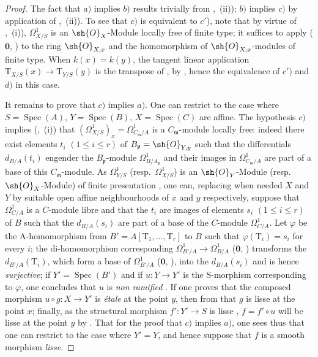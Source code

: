 \begin{proof}
The fact that $a)$ implies $b)$ results trivially from ,~(ii)); $b)$ implies $c)$ by application of ,~(ii)).
To see that $c)$ is equivalent to $c'$), note that by virtue of ,~(i)), $\Omega^1_{X/S}$ is an $\sh{O}_X$-Module locally free of finite type; it suffices to apply ($\mathbf{0}$, ) to the ring $\sh{O}_{X,x}$ and the homomorphism  of $\sh{O}_{X,x}$-modules of finite type.
When $k(x)=k(y)$, the tangent linear application $\mathrm{T}_{X/S}(x)\to\mathrm{T}_{Y/S}(y)$ is the transpose of , by , hence the equivalence of $c')$ and $d)$ in this case.


It remains to prove that $c)$ implies $a)$.
One can restrict to the case where $S=\operatorname{Spec}(A)$, $Y=\operatorname{Spec}(B)$, $X=\operatorname{Spec}(C)$ are affine.
The hypothesis $c)$ implies (,~(i)) that $(\Omega^1_{X/S})_x=\Omega^1_{C_\mathfrak{m}/A}$ is a $C_\mathfrak{m}$-module locally free: indeed  there exist elements $t_i$ $(1\leq i\leq r)$ of $B_\mathfrak{p}=\sh{O}_{Y,y}$ such that the differentials $d_{B/A}(t_i)$ engender the $B_\mathfrak{p}$-module $\Omega^1_{B/A_\mathfrak{p}}$ and their images in $\Omega^1_{C_\mathfrak{m}/A}$ are part of a base of this $C_\mathfrak{m}$-module.
As $\Omega^1_{Y/S}$ (resp.\ $\Omega^1_{X/S}$) is an $\sh{O}_Y$-Module (resp.\ $\sh{O}_X$-Module) of finite presentation , one can, replacing when needed $X$ and $Y$ by suitable open affine neighbourhoods of $x$ and $y$ respectively, suppose that $\Omega^1_{C/A}$ is a $C$-module libre and that the $t_i$ are images of elements $s_i$ $(1\leq i\leq r)$ of $B$ such that the $d_{B/A}(s_i)$ are part of a base of the $C$-module $\Omega^1_{C/A}$.
Let $\varphi$ be the A-homomorphism from $B'=A[\mathrm{T}_1,\ldots,\mathrm{T}_r]$ to $B$ such that $\varphi(\mathrm{T}_i)=s_i$ for every $i$; the di-homomorphism corresponding $\Omega^1_{B'/A}\to\Omega^1_{B/A}$ ($\mathbf{0}$, ) transforms the $d_{B'/A}(\mathrm{T}_i)$, which form a base of $\Omega^1_{B'/A}$ ($\mathbf{0}$, ), into the $d_{B/A}(s_i)$ and is hence \emph{surjective}; if $Y'=\operatorname{Spec}(B')$ and if $u:Y\to Y'$ is the S-morphism corresponding to $\varphi$, one concludes that $u$ is \emph{non ramified} .
If one proves that the composed morphism $u\circ g:X\to Y'$ is \emph{\'etale} at the point $y$, then from  that $g$ is lisse at the point $x$; finally, as the structural morphism $f':Y'\to S$ is lisse , $f=f'\circ u$ will be lisse at the point $y$ by .
That for the proof that $c)$ implies $a)$, one sees thus that one can restrict to the case where $Y'=Y$, and hence suppose that $f$ is a smooth morphism \emph{lisse}.


\end{proof}

